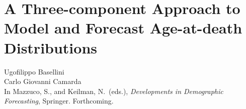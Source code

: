 \documentclass[Thesis]{subfiles}
\begin{document}
\newpage
\chapter{A Three-component Approach to Model and Forecast Age-at-death Distributions}\label{Ch4}
\thispagestyle{empty}
\pagecolor{pagecolor}\afterpage{\nopagecolor}
\vspace{1cm}
\Large
Ugofilippo Basellini\\
Carlo Giovanni Camarda
\vspace{2cm}
\\ In Mazzuco, S., and Keilman, N.~(eds.), \textit{Developments in Demographic Forecasting}, Springer. Forthcoming.\\
\clearpage

\thispagestyle{empty}
\pagecolor{pagecolor}\afterpage{\nopagecolor}
\section*{}
\clearpage

\end{document}
